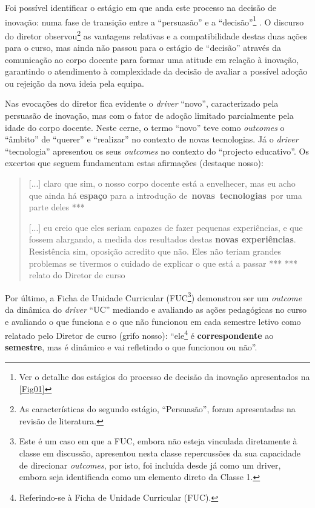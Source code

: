 \documentclass{textolivre}
\begin{document}
Foi possível identificar o estágio em que anda este processo na decisão de inovação: numa fase de transição entre a “persuasão” e a “decisão”\footnote{Ver o detalhe dos estágios do processo de decisão da inovação apresentados na \cref{Fig01}} \cite{rogers1983}. O discurso do diretor observou\footnote{As características do segundo estágio, “Persuasão”, foram apresentadas na revisão de literatura.} as vantagens relativas e a compatibilidade destas duas ações para o curso, mas ainda não passou para o estágio de “decisão” através da comunicação ao corpo docente para formar uma atitude em relação à inovação, garantindo o atendimento à complexidade da decisão de avaliar a possível adoção ou rejeição da nova ideia pela equipa.

Nas evocações do diretor fica evidente o \textit{driver} “novo”, caracterizado pela persuasão de inovação, mas com o fator de adoção limitado parcialmente pela idade do corpo docente. Neste cerne, o termo “novo” teve como \textit{outcomes} o “âmbito” de “querer” e “realizar” no contexto de novas tecnologias. Já o \textit{driver} “tecnologia” apresentou os seus \textit{outcomes} no contexto do “projecto educativo”. Os excertos que seguem fundamentam estas afirmações (destaque nosso):

\begin{quote}
[...] claro que sim, o nosso corpo docente está a envelhecer, mas eu acho que ainda há \textbf{espaço} para a introdução de \textbf{novas tecnologias} por uma parte deles ***

[...] eu creio que eles seriam capazes de fazer pequenas experiências, e que fossem alargando, a medida dos resultados destas \textbf{novas experiências}. Resistência sim, oposição acredito que não. Eles não teriam grandes problemas se tivermos o cuidado de explicar o que está a passar ***
*** relato do Diretor de curso
\end{quote}

Por último, a Ficha de Unidade Curricular (FUC\footnote{Este é um caso em que a FUC, embora não esteja vinculada diretamente à classe em discussão, apresentou nesta classe repercussões da sua capacidade de direcionar \textit{outcomes}, por isto, foi incluída desde já como um driver, embora seja identificada como um elemento direto da Classe 1.}) demonstrou ser um \textit{outcome} da dinâmica do \textit{driver} “UC” mediando e avaliando as ações pedagógicas no curso e avaliando o que funciona e o que não funcionou em cada semestre letivo como relatado pelo Diretor de curso (grifo nosso): “ele\footnote{Referindo-se à Ficha de Unidade Curricular (FUC).} é \textbf{correspondente} ao \textbf{semestre}, mas é dinâmico e vai refletindo o que funcionou ou não”.
\end{document}
